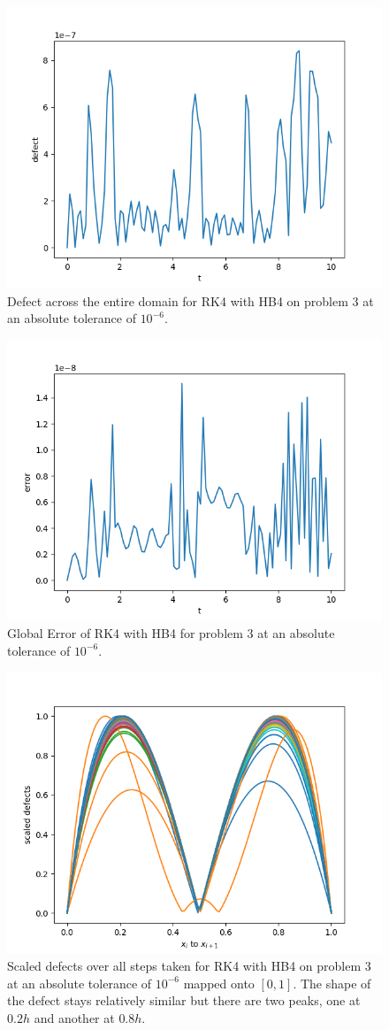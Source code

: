 \begin{figure}[H]
\centering
\includegraphics[width=0.7\linewidth]{./figures/rk4_with_hb4_p3_global_defect}
\caption{Defect across the entire domain for RK4 with HB4 on problem 3 at an absolute tolerance of $10^{-6}$.}
\label{fig:rk4_with_hb4_p3_global_defect}
\end{figure}

\begin{figure}[H]
\centering
\includegraphics[width=0.7\linewidth]{./figures/rk4_with_hb4_p3_global_error}
\caption{Global Error of RK4 with HB4 for problem 3 at an absolute tolerance of $10^{-6}$.}
\label{fig:rk4_with_hb4_p3_global_error}
\end{figure}

\begin{figure}[H]
\centering
\includegraphics[width=0.7\linewidth]{./figures/rk4_with_hb4_p3_scaled_defects}
\caption{Scaled defects over all steps taken for RK4 with HB4 on problem 3 at an absolute tolerance of $10^{-6}$ mapped onto $[0, 1]$. The shape of the defect stays relatively similar but there are two peaks, one at $0.2h$ and another at $0.8h$.}
\label{fig:rk4_with_hb4_p3_scaled_defects}
\end{figure}


